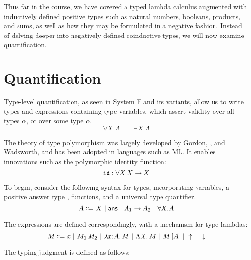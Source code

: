 \documentclass{article}
\begin{document}
\maketitle

Thus far in the course, we have covered a typed lambda calculus augmented with inductively defined
positive types such as natural numbers, booleans, products, and sums, as well as how they may be
formulated in a negative fashion. Instead of delving deeper into negatively defined coinductive
types, we will now examine quantification.

\section{Quantification}

Type-level quantification, as seen in System F and its variants, allow us to write types and expressions
containing type variables, which assert validity over all types $\alpha$, or over some type $\alpha$.
\[ \forall X. A \qquad \exists X.A \]

The theory of type polymorphism was largely developed by Gordon, \cite{Milner}, and Wadsworth, and
has been adopted in languages such as ML. It enables innovations such as the polymorphic identity
function:
\[ \texttt{id} : \forall X. X \to X \]

To begin, consider the following syntax for types, incorporating variables, a positive answer type
\ans, functions, and a universal type quantifier.
\[ A \Coloneqq X~|~\mathsf{ans}~|~A_1 \to A_2~|~\forall X. A \]

The expressions are defined correspondingly, with a mechanism for type lambdas:
\[ M \Coloneqq x~|~M_1\,M_2~|~\lambda x {:} A.\, M~|~\Lambda X.\, M~|~M\,[A]~|~\uparrow~|~\downarrow \]

The typing judgment is defined as follows:
\end{document}
